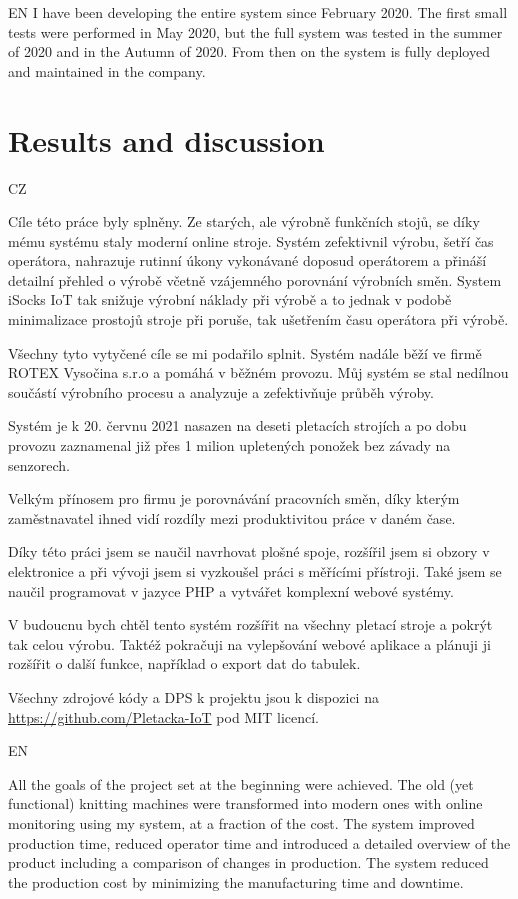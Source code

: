 \documentclass[12pt, a4paper]{article}
\begin{document}
EN
I have been developing the entire system since February 2020.
The first small tests were performed in May 2020, but the full system was tested in the summer of 2020 and in the Autumn of 2020.
From then on the system is fully deployed  and maintained in the company.


\newpage
\section*{Results and discussion}

CZ

Cíle této práce byly splněny. Ze starých, ale výrobně funkčních stojů, se díky mému systému staly moderní online stroje.
Systém zefektivnil výrobu, šetří čas operátora, nahrazuje rutinní úkony vykonávané doposud operátorem a přináší detailní přehled o výrobě včetně vzájemného porovnání výrobních směn.
System iSocks IoT tak snižuje výrobní náklady při výrobě a to jednak v podobě minimalizace prostojů stroje při poruše, tak ušetřením času operátora při výrobě.


Všechny tyto vytyčené cíle se mi podařilo splnit.
Systém nadále běží ve firmě ROTEX Vysočina s.r.o a pomáhá v běžném provozu.
Můj systém se stal nedílnou součástí výrobního procesu a analyzuje a zefektivňuje průběh výroby.

Systém je k 20. červnu 2021 nasazen na deseti pletacích strojích a po dobu provozu zaznamenal již přes 1 milion upletených ponožek bez závady na senzorech.

Velkým přínosem pro firmu je porovnávání pracovních směn, díky kterým zaměstnavatel ihned vidí rozdíly mezi produktivitou práce v daném čase.

Díky této práci jsem se naučil navrhovat plošné spoje, rozšířil jsem si obzory v elektronice a při vývoji jsem si vyzkoušel práci s měřícími přístroji.
Také jsem se naučil programovat v jazyce PHP a vytvářet komplexní webové systémy.

V budoucnu bych chtěl tento systém rozšířit na všechny pletací stroje a pokrýt tak celou výrobu.
Taktéž pokračuji na vylepšování webové aplikace a plánuji ji rozšířit o další funkce, například o export dat do tabulek.

Všechny zdrojové kódy a DPS k projektu jsou k dispozici na \url{https://github.com/Pletacka-IoT} pod MIT licencí.

EN

All the goals of the project set at the beginning were achieved.
The old (yet functional) knitting machines were transformed into modern ones with online monitoring using my system, at a fraction of the cost.
The system improved production time, reduced operator time and introduced a detailed overview of the product including a comparison of changes in production.
The system reduced the production cost by minimizing the manufacturing time and downtime.
\end{document}
